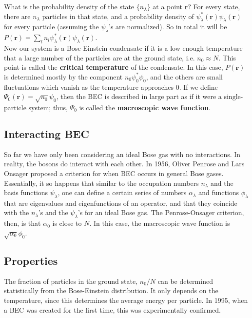 \documentclass{article}
\begin{document}
What is the probability density of the state $\{n_\lambda\}$ at a point $\mathbf{r}$?  For every state, there are $n_\lambda$ particles in that state, and a probability density of $\psi_\lambda^*(\mathbf{r}) \psi_\lambda(\mathbf{r})$ for every particle (assuming the $\psi_\lambda$'s are normalized). So in total it will be $P(\mathbf{r}) = \sum_l{n_l \psi_\lambda^*(\mathbf{r}) \psi_\lambda(\mathbf{r})}$.
\\

Now our system is a Bose-Einstein condensate if it is a low enough temperature that a large number of the particles are at the ground state, i.e. $n_0 \approx N$.  This point is called the \textbf{critical temperature} of the condensate.  In this case, $P(\mathbf{r})$ is determined mostly by the component $n_0\psi^*_0\psi_0$, and the others are small fluctuations which vanish as the temperature approaches $0$.  If we define $\Psi_0(\mathbf{r}) = \sqrt{n_0} \psi_0$, then the BEC is described in large part as if it were a single-particle system; thus, $\Psi_0$ is called the \textbf{macroscopic wave function}.

\subsection{Interacting BEC}

So far we have only been considering an ideal Bose gas with no interactions.  In reality, the bosons do interact with each other.  In 1956, Oliver Penrose and Lars Onsager proposed a criterion for when BEC occurs in general Bose gases.  Essentially, it so happens that similar to the occupation numbers $n_\lambda$ and the basis functions $\psi_\lambda$, one can define a certain series of numbers $\alpha_\lambda$ and functions $\phi_\lambda$ that are eigenvalues and eigenfunctions of an operator, and that they coincide with the $n_\lambda$'s and the $\psi_\lambda$'s for an ideal Bose gas.  The Penrose-Onsager criterion, then, is that $\alpha_0$ is close to $N$.  In this case, the macroscopic wave function is $\sqrt{\alpha_0} \phi_0$. 

\subsection{Properties}

The fraction of particles in the ground state, $n_0/N$ can be determined statistically from the Bose-Einstein distribution.  It only depends on the temperature, since this determines the average energy per particle.  In 1995, when a BEC was created for the first time, this was experimentally confirmed.
\end{document}
